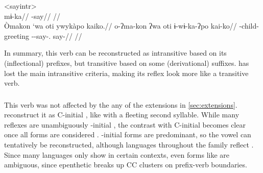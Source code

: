 \pex<sayintr>
 \akuriyo \parencite[][113]{meira1998proto}\\
\begingl
\gla mɨ-ka//
\glb {}-say//
\glft {}//
\endgl
{} \kalina \parencite[][202]{courtz2008carib}\\
\begingl
\glpreamble Òmakon `wa oti ywykàpo kaiko.//
\gla o-ʔma-kon ʔwa oti ɨ-wɨ-ka-ʔpo kai-ko//
\glb {}-child-  greeting --say-. say-//
\glft {}//
\endgl
\xe

In summary, this verb can be reconstructed as intransitive based on its (inflectional) prefixes, but transitive based on some (derivational) suffixes.
\hixka has lost the main intransitive criteria, making its reflex look more like a transitive verb.

\subsubsection{ }
\label{sec:go}
This verb was not affected by the any of the extensions in \cref{sec:extensions}.
\textcite{gildea2007greenberg} reconstruct it as C-initial , like   with a fleeting second syllable.
While many reflexes are unambiguously -initial , the contrast with C-initial  becomes clear once all forms are considered .
-initial forms are predominant, so the vowel can tentatively be reconstructed, although languages throughout the family reflect .
Since many languages only show  in certain contexts, even forms like \trio {}  \parencite[43]{triomeira1999} are ambiguous, since epenthetic  breaks up CC clusters on prefix-verb boundaries.




